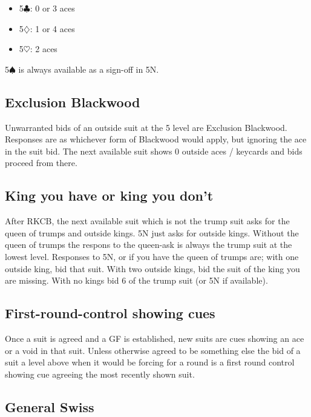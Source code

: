 \documentclass[a4paper,14pt]{extarticle}
\begin{document}
\begin{itemize}
\item 5$\clubsuit$: 0 or 3 aces
\item 5$\diamondsuit$: 1 or 4 aces
\item 5$\heartsuit$: 2 aces
\end{itemize}

5$\spadesuit$ is always available as a sign-off in 5N.

\newpage

\subsection{Exclusion Blackwood}
\label{sec:exclusion}

Unwarranted bids of an outside suit at the 5 level are Exclusion Blackwood.
Responses are as whichever form of Blackwood would apply, but ignoring the ace
in the suit bid. The next available suit shows 0 outside aces / keycards and
bids proceed from there.


\subsection{King you have or king you don't}
\label{sec:kyhokyd}

After RKCB, the next available suit which is not the trump suit asks for the
queen of trumps and outside kings. 5N just asks for outside kings. Without the
queen of trumps the respons to the queen-ask is always the trump suit at the
lowest level. Responses to 5N, or if you have the queen of trumps are; with one
outside king, bid that suit. With two outside kings, bid the suit of the king
you are missing. With no kings bid 6 of the trump suit (or 5N if available).

\subsection{First-round-control showing cues}
\label{sec:cues}

Once a suit is agreed and a GF is established, new suits are cues showing an
ace or a void in that suit. Unless otherwise agreed to be something else the
bid of a suit a level above when it would be forcing for a round is a first round
control showing cue agreeing the most recently shown suit.

\newpage

\subsection{General Swiss}
\label{sec:swiss}
\end{document}

